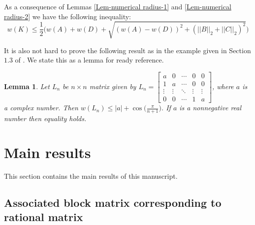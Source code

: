 \documentclass[12pt, reqno]{amsart}
\newtheorem{lemma}[theorem]{Lemma}
\theoremstyle{definition}
\theoremstyle{remark}
\numberwithin{equation}{section}
\begin{document}
\medskip
\noindent
As a consequence of Lemmas \ref{Lem-numerical radius-1} and 
\ref{Lem-numerical radius-2} we have the following inequality:
\begin{equation}\label{Eqn-numerical radius inq}
w(K) \leq \displaystyle \frac{1}{2} \Big(w(A)+ w(D) +\sqrt{(w(A)-w(D))^2+ 
(||B||_2+||C||_2)^2} \Big)
\end{equation}


\noindent
It is also not hard to prove the following result as in the example given in Section 
$1.3$ of \cite{Gustafson-Rao}. We state this as a lemma for ready reference.

\begin{lemma}\label{Lem-numerical radius-Jordan block}
Let $L_n$ be $n \times n$ matrix given by $L_n =\begin{bmatrix}
a & 0 & \cdots & 0 & 0\\
1 & a & \cdots & 0 & 0\\
\vdots & \vdots & \ddots & \vdots & \vdots \\
0 & 0 & \cdots & 1 & a 
\end{bmatrix}$, where $a$ is a complex number. Then $w(L_n) \leq \displaystyle |a|+ 
\cos\Big(\frac{\pi}{n+1}\Big)$. 
If $a$ is a nonnegative real number then equality holds.
\end{lemma}


\section{Main results}\label{sec-3}
This section contains the main results of this manuscript.
\subsection{Associated block matrix corresponding to rational matrix}\label{sec-3.1}

\
\end{document}
